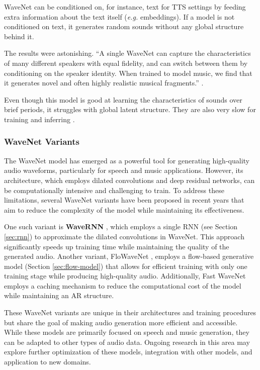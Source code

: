 WaveNet can be conditioned on, for instance, text for \ac{TTS} settings by feeding extra information about the text itself (\textit{e.g.} embeddings). If a model is not conditioned on text, it generates random sounds without any global structure behind it.

The results were astonishing. ``A single WaveNet can capture the characteristics of many different speakers with equal fidelity, and can switch between them by conditioning on the speaker identity. When trained to model music, we find that it generates novel and often highly realistic musical fragments.'' \cite{oord_wavenet_2016}.

Even though this model is good at learning the characteristics of sounds over brief periods, it struggles with global latent structure. They are also very slow for training and inferring \cite{tahiroglu_-terity_2020}.


\subsubsection{WaveNet Variants} \label{sec:wavenet-variants}

The WaveNet model has emerged as a powerful tool for generating high-quality audio waveforms, particularly for speech and music applications. However, its architecture, which employs dilated convolutions and deep residual networks, can be computationally intensive and challenging to train. To address these limitations, several WaveNet variants have been proposed in recent years that aim to reduce the complexity of the model while maintaining its effectiveness.

One such variant is \textbf{WaveRNN} \cite{kalchbrenner_efficient_2018}, which employs a single \ac{RNN} (see Section \ref{sec:rnn}) to approximate the dilated convolutions in WaveNet. This approach significantly speeds up training time while maintaining the quality of the generated audio. Another variant, FloWaveNet \cite{kim_flowavenet_2018}, employs a flow-based generative model (Section \ref{sec:flow-model}) that allows for efficient training with only one training stage while producing high-quality audio. Additionally, Fast WaveNet  \cite{paine_fast_2016} employs a caching mechanism to reduce the computational cost of the model while maintaining an \ac{AR} structure.

These WaveNet variants are unique in their architectures and training procedures but share the goal of making audio generation more efficient and accessible. While these models are primarily focused on speech and music generation, they can be adapted to other types of audio data. Ongoing research in this area may explore further optimization of these models, integration with other models, and application to new domains.

